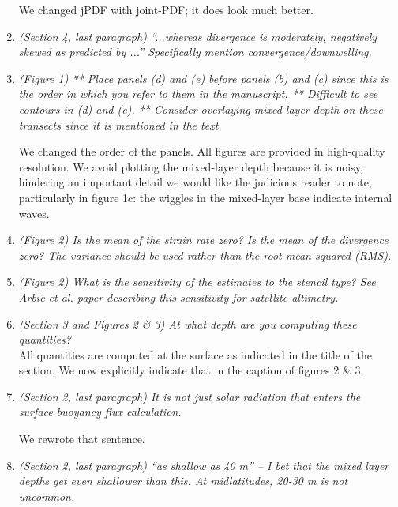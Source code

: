 \documentclass[11pt]{article}
\newcommand{\bdp}{\begin{description}}
\newcommand{\edp}{\end{description}}
\begin{document}
\begin{enumerate}
We changed jPDF with joint-PDF; it does look much better.

\item {\it (Section 4, last paragraph) ``...whereas divergence is moderately, negatively skewed as
        predicted by ...'' Specifically mention convergence/downwelling.}

\item {\it (Figure 1) ** Place panels (d) and (e) before panels (b) and (c) since this is the order
        in which you refer to them in the manuscript. ** Difficult to see contours in (d) and
        (e). ** Consider overlaying mixed layer depth on these transects since it is mentioned
        in the text.}

        \bdp
          We changed the order of the panels. All figures are provided in high-quality
          resolution. We avoid plotting the mixed-layer depth because it is noisy,
          hindering an important detail we would like the judicious reader to note,
          particularly in figure 1c: the wiggles in the mixed-layer base
          indicate internal waves.
        \edp

\item {\it (Figure 2) Is the mean of the strain rate zero? Is the mean of the divergence zero? The
        variance should be used rather than the root-mean-squared (RMS).}


\item {\it (Figure 2) What is the sensitivity of the estimates to the stencil type? See Arbic et al.
        paper describing this sensitivity for satellite altimetry.}

\item {\it (Section 3 and Figures 2 \& 3) At what depth are you computing these quantities?}\\

  All quantities are computed at the surface as indicated in the title of the
  section. We now explicitly indicate that in the caption of figures 2 \& 3.

\item {\it (Section 2, last paragraph) It is not just solar radiation that enters the surface buoyancy
      flux calculation.}

      We rewrote that sentence.

\item {\it (Section 2, last paragraph) ``as shallow as 40 m'' – I bet that the mixed layer depths get
      even shallower than this. At midlatitudes, 20-30 m is not uncommon.}\\


\end{enumerate}
\end{document}
